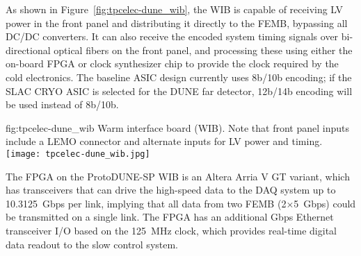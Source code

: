 As shown in Figure~\ref{fig:tpcelec-dune_wib}, the WIB is capable of receiving LV power in the front panel and distributing it directly to the FEMB, bypassing all DC/DC converters.
It can also receive the encoded system timing signals over bi-directional optical
fibers on the front panel, and processing these using either
the on-board FPGA or clock synthesizer chip to provide the clock required by the cold electronics.
The baseline ASIC design currently uses 8b/10b encoding; if the SLAC CRYO ASIC is selected for
the DUNE far detector, 12b/14b encoding will be used instead of 8b/10b.

\begin{dunefigure}
{fig:tpcelec-dune_wib}
{Warm interface board (WIB). Note that front panel inputs include a LEMO connector and alternate inputs for LV power and timing.}
\texttt{[image: tpcelec-dune\_wib.jpg]}
\end{dunefigure}

The FPGA on the ProtoDUNE-SP WIB is an Altera Arria V GT variant, which has
transceivers that can drive the high-speed data to the DAQ system up to
10.3125~Gbps per link, implying that all data from
two FEMB (2$\times$5~Gbps) could be transmitted on a single link.
The FPGA has an additional Gbps Ethernet transceiver I/O based on the 125~MHz clock, which 
provides real-time digital data readout to the slow control system.
